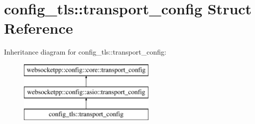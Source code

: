 \hypertarget{structconfig__tls_1_1transport__config}{}\section{config\+\_\+tls\+:\+:transport\+\_\+config Struct Reference}
\label{structconfig__tls_1_1transport__config}
Inheritance diagram for config\+\_\+tls\+:\+:transport\+\_\+config\+:\begin{figure}[H]
\begin{center}
\leavevmode
\includegraphics[height=3.000000cm]{structconfig__tls_1_1transport__config}
\end{center}
\end{figure}
